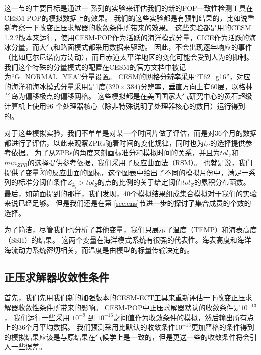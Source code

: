  
这一节的主要目标是通过一 系列的实验来评估我们的新的POP一致性检测工具在CESM-POP的模拟数据上的效果。
我们的这些实验都是有预判结果的，比如说重新考察一下改变正压求解器的收敛条件所带来的效果。
这些实验都是用的CESM 1.2.2版本来运行，使用CESM-POP作为活跃的海洋模式分量，CICE作为活跃的海冰分量，而大气和路面模式都采用数据来驱动。
因此，不会出现逐年响应的事件（比如厄尔尼诺南方涛动），而且赤道太平洋地区的变化可能会受到人为的抑制。
我们这个特殊的分量模式的配置在CESM的官方文档中被记为“G\_NORMAL\_YEA”分量设置。
CESM的网格分辨率采用“T62\_g16”，对应的海洋和海冰模式分量采用是1度($320 \times 384$)分辨率，垂直方向上有60层，以格林兰岛为偏移极点的偏移网格。 
这些模拟都是在美国国家大气研究中心的黄石超级计算机上使用$96$ 个处理器核心（除非特殊说明了处理器核心的数目）运行得到的。 

 对于这些模拟实验，我们不单单是对某一个时间片做了评估，而是对36个月的数据都进行了评估，以此来观察ZPRs随着时间的变化规律，同时也为$t_C$的选择提供参考依据。
为了从ZPRs的角度来刻画标准分和模拟时间的关系，并且为$tol_{Z}$和$min_{ZPR}$的选择提供参考依据，我们采用了反应曲面法（RSM）\citep{box2007}。 
也就是说，我们提供了变量$\tilde{X}$的反应曲面的图标，这个图表中给出了不同的模拟月份中，满足一系列的标准分阈值条件$Z_{\tilde{x_i}} > tol_{Z}$的点的比例的关于给定阈值$tol_{Z}$的累积分布函数。
最后，如前面提到的那样，我们发现，40个模拟结果组成集合模拟对于我们的实验来说已经足够。
但是我们还是在第 \ref{sec:ens}节进一步的探讨了集合成员的个数的选择。  

为了简洁，尽管我们也分析了其他变量，我们只展示了温度（TEMP）和海表高度（SSH）的结果。 
这两个变量在海洋模式系统有很强的代表性。海表高度和海洋海流动力系统密切相关，而温度是由模型的标量传输决定的。
 

\subsection{正压求解器收敛性条件}

 
首先，我们先用我们新的加强版本的CESM-ECT工具来重新评估一下改变正压求解器收敛性条件所带来的影响。
CESM-POP中正压求解器默认的收敛条件是$10^{-13}$， 我们运行一些采用 $10^{-9}$ 到 $10^{-16}$之间值作为收敛条件的模拟，然后输出所有点上的36个月平均数据。
我们预测采用比默认的收敛条件$10^{-13}$更加严格的条件得到的模拟结果应该是与原结果在气候学上是一致的，但是更送一些的收敛条件将会引入一些误差。


